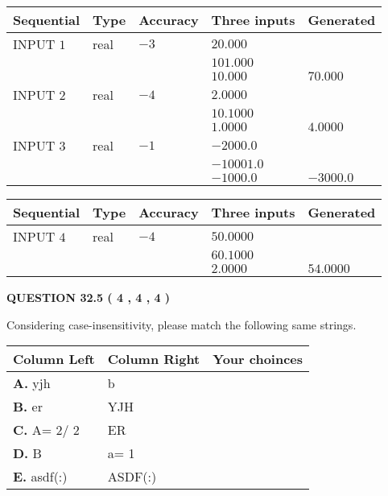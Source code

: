\documentclass[12pt]{article}
\begin{document}
  
\noindent\begin{tabular}{|l|l|l|l|l|}
\hline
 Sequential & Type & Accuracy & Three inputs & Generated \\ 
\hline
 
 
  INPUT $            1 $ & real & $           -3  $ & $
 20.000
  $ & \\
  & & &  $
 101.000
  $ & \\
  & & &  $
 10.000
 $ & $ 70.000 $ 
 \\  \hline  
 
 
  INPUT $            2 $ & real & $           -4  $ & $
 2.0000
  $ & \\
  & & &  $
 10.1000
  $ & \\
  & & &  $
 1.0000
 $ & $ 4.0000 $ 
 \\  \hline  
 
 
  INPUT $            3 $ & real & $           -1  $ & $
 -2000.0
  $ & \\
  & & &  $
 -10001.0
  $ & \\
  & & &  $
 -1000.0
 $ & $ -3000.0 $ 
 \\  \hline  
 \end{tabular}
   
   
  
  
\noindent\begin{tabular}{|l|l|l|l|l|}
\hline
 Sequential & Type & Accuracy & Three inputs & Generated \\ 
\hline
 
 
  INPUT $            4 $ & real & $           -4  $ & $
 50.0000
  $ & \\
  & & &  $
 60.1000
  $ & \\
  & & &  $
 2.0000
 $ & $ 54.0000 $ 
 \\  \hline  
 \end{tabular}
   
   
  
\vspace{0.2in}
  
{\textbf{\Large{QUESTION
32.5 
 (           4 ,           4 ,           4 )
}}}
  
  
Considering case-insensitivity, please match the following same strings.
  
  
\begin{tabular}{|l|l|l|}
 \hline
 Column Left & Column Right  & Your choinces \\ 
 \hline
{\textbf{\large{
A.}}}
yjh
  & 
b
 & 
 \\ 
 \hline
{\textbf{\large{
B.}}}
er
  & 
YJH
 & 
 \\ 
 \hline
{\textbf{\large{
C.}}}
 A= %
2/ %
2

  & 
ER
 & 
 \\ 
 \hline
{\textbf{\large{
D.}}}
B
  & 
 a= %
1
 & 
 \\ 
 \hline
{\textbf{\large{
E.}}}
asdf(:)
  & 
ASDF(:)
 & 
 \\ 
 \hline
 \end{tabular}
  
\end{document}
